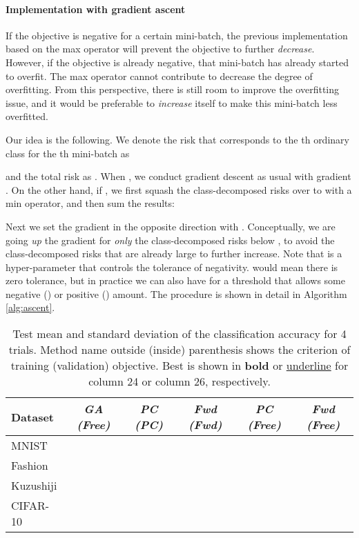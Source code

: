 \documentclass{article}
\begin{document}
\paragraph{Implementation with gradient ascent}
If the objective is negative for a certain mini-batch, the previous implementation based on the max operator will prevent the objective to further \emph{decrease}.  However, if the objective is already negative, that mini-batch has already started to overfit.  The max operator cannot contribute to decrease the degree of overfitting. From this perspective, there is still room to improve the overfitting issue, and it would be preferable to \emph{increase} itself to make this mini-batch less overfitted.

Our idea is the following.
We denote the risk that corresponds to the th ordinary class for the th mini-batch as

and the total risk as
.
When , we conduct gradient descent as usual with gradient .
On the other hand, if , we first squash the class-decomposed risks over  to  with a min operator, and then sum the results:

Next we set the gradient in the opposite direction with .  Conceptually, we are going \emph{up} the gradient  for \emph{only} the class-decomposed risks below , to avoid the class-decomposed risks that are already large to further increase.
Note that  is a hyper-parameter that controls the tolerance of negativity.   would mean there is zero tolerance, but in practice we can also have  for a threshold that allows some negative () or positive () amount.
The procedure is shown in detail in Algorithm \ref{alg:ascent}.
\begin{table*}[t]
  \center
  \small
  \caption{Test mean and standard deviation of the classification accuracy for 4 trials.  Method name outside (inside) parenthesis shows the criterion of training (validation) objective.  Best is shown in {\bf bold} or \underline{underline} for column 24 or column 26, respectively.}
  \label{tb:validation}
  \tabcolsep=0.2cm
    \begin{tabular}{l|ccc|cc}\toprule
    Dataset & \emph{GA (Free)} & \emph{PC (PC)} & \emph{Fwd (Fwd)} & \emph{PC (Free)} & \emph{Fwd (Free)} \\\midrule
    MNIST&&&\bm{}&&\underline{}\\\midrule
    Fashion&&&&& \\\midrule
    Kuzushiji&\bm{}&&&&\underline{} \\\midrule
    CIFAR-10&&&&& \\\bottomrule
  \end{tabular}
\end{table*}
\end{document}
